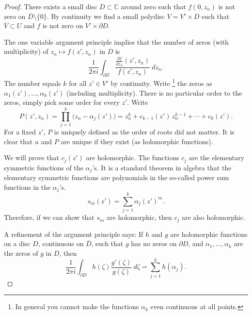 \documentclass[12pt,openany]{book}
\newcommand{\C}{{\mathbb{C}}}
\theoremstyle{plain}
\theoremstyle{remark}
\theoremstyle{definition}
\theoremstyle{exercise}
\theoremstyle{example}
\begin{document}
\begin{proof}
There exists a small disc $D \subset \C$ around zero such that
$f(0,z_n)$ is not zero on $\overline{D} \setminus \{ 0 \}$.  By continuity
we find a small polydisc $V = V' \times D$ such that
$\overline{V} \subset U$ and $f$ is not zero on
$V' \times \partial D$.

The one variable argument principle implies that the number of zeros (with
multiplicity) of $z_n
\mapsto f(z',z_n)$ in $D$ is
\begin{equation*}
\frac{1}{2\pi i}
\int_{\partial D}
\frac{\frac{\partial f}{\partial z_n} (z',z_n)}{f(z',z_n)} ~dz_n .
\end{equation*}
The number equals $k$ for all $z' \in V'$ by continuity.
Write%
\footnote{In general you cannot make the
functions $\alpha_k$ even continuous at all points.}
the zeros as $\alpha_1(z'),\ldots,\alpha_k(z')$ (including
multiplicity).  There is no particular order to the zeros,
simply pick some order for every $z'$.
Write
\begin{equation*}
P(z',z_n)
=
\prod_{j=1}^k \bigl(z_n-\alpha_j(z')\bigr)
=
z_n^k + c_{k-1}(z') \, z_n^{k-1} + \cdots + c_0 (z') .
\end{equation*}
For a fixed $z'$, $P$ is uniquely defined as the order of roots did not
matter.  It is
clear that
$u$ and $P$ are unique if they exist (as holomorphic functions).

We will prove that $c_j(z')$ are holomorphic.  The functions $c_j$ are
the elementary symmetric functions of the $\alpha_j$'s.  It is a standard
theorem in algebra that the elementary symmetric functions are
polynomials in the so-called power sum functions in the $\alpha_j$'s.
\begin{equation*}
s_m(z') = \sum_{j=1}^k \alpha_j{(z')}^m .
\end{equation*}
Therefore, if we can show that $s_m$ are holomorphic, then $c_j$ are also
holomorphic.

A refinement of the argument principle says:
If $h$ and $g$ are
holomorphic functions on a disc $D$, continuous on $\overline{D}$,
such that $g$ has no zeros on $\partial D$, and $\alpha_1,\ldots,\alpha_k$
are the zeros of $g$ in $D$, then
\begin{equation*}
\frac{1}{2 \pi i}
\int_{\partial D} h(\zeta) \frac{g'(\zeta)}{g(\zeta)} ~d\zeta
= \sum_{j=1}^k h(\alpha_j) .
\end{equation*}


\end{proof}
\end{document}
